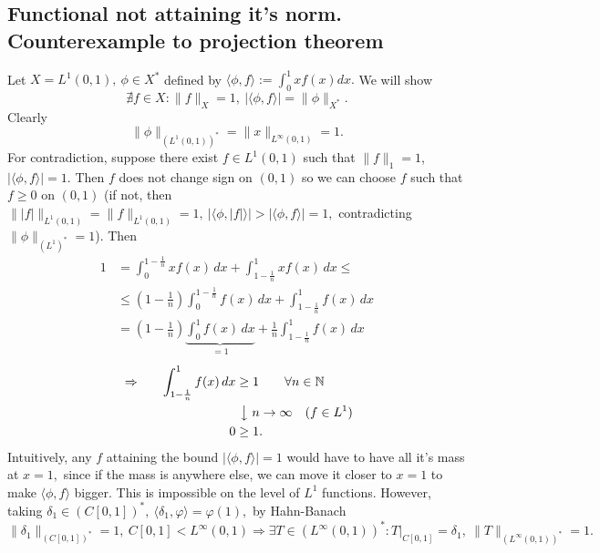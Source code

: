\documentclass[12pt,a4paper]{article}
\newcommand\nm[1]{\lVert #1 \rVert}
\renewcommand\:{\colon}
\begin{document}
\subsection{Functional not attaining it's norm. Counterexample to projection theorem}
Let $X=L^{1}(0,1),\ \phi\in X^{*}$ defined by $\langle\phi,f\rangle:= \int_0^1 xf(x)dx.$ We will show
\begin{equation*}
	\nexists f\in X\: \nm{f}_X=1, \ |\langle \phi, f\rangle|=\nm{\phi}_{X^{*}}.
\end{equation*}
Clearly 
\begin{equation*}
  \nm{\phi}_{(L^{1}(0,1))^{*}}=\nm{x}_{L^{\infty}(0,1)}=1. 
\end{equation*}
For contradiction, suppose there exist $f\in L^{1}(0,1)$ such that $\nm{f}_1=1$, $|\langle \phi, f\rangle|=1.$ Then $f$ does not change sign on $(0,1)$ so we can choose $f$ such that $f\geq 0$ on $(0,1)$ (if not, then $\nm{|f|}_{L^{1}(0,1)}=\nm{f}_{L^{1}(0,1)}=1, \ |\langle \phi, |f|\rangle|>|\langle \phi, f\rangle|=1,$ contradicting $\nm{\phi}_{(L^{1})^{*}}=1$). Then
\begin{align*}
1
&= \int_0^{1-\frac{1}{n}}xf(x)\,dx+\int_{1-\frac{1}{n}}^1xf(x)\,dx \leq \\
&\leq \left(1-\frac{1}{n}\right)\int_0^{1-\frac{1}{n}}f(x)\,dx + \int_{1-\frac{1}{n}}^1f(x)\,dx \\
&= \left(1-\frac{1}{n}\right)\underbrace{\int_0^1f(x)\,dx}_{=1}
+ \frac{1}{n}\int_{1-\frac{1}{n}}^1f(x)\,dx
\end{align*}
\vspace{-.8cm}
\begin{alignat*}{2}
&\Rightarrow \quad &\int_{1-\frac{1}{n}}^1 f(x)\,dx &\ge 1 \qquad \forall n\in\mathbb N \\
& & &\ \big\downarrow \; n\to\infty \quad (f\in L^{1}) \\
& & 0 &\ge 1.
\end{alignat*}
Intuitively, any $f$ attaining the bound $|\langle \phi, f\rangle|=1$ would have to have all it's mass at $x=1,$ since if the mass is anywhere else, we can move it closer to $x=1$ to make $\langle \phi,f\rangle$ bigger. This is impossible on the level of $L^{1}$ functions. However, taking $\delta_1 \in (C[0,1])^{*}, \ \langle\delta_1,\varphi \rangle=\varphi(1),$ by Hahn-Banach
\begin{equation*}
	\nm{\delta_1}_{(C[0,1])^{*}}=1, \ C[0,1]<L^{\infty}(0,1) \Rightarrow \exists T\in (L^{\infty}(0,1))^{*}\: T\rvert_{C[0,1]}=\delta_1, \ \nm{T}_{(L^{\infty}(0,1))^{*}}=1.
\end{equation*}
\end{document}
